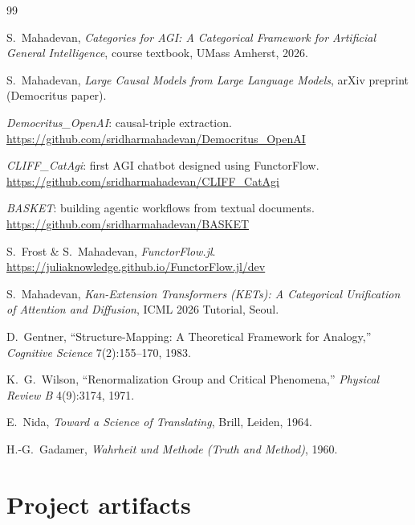 \documentclass[10pt,letterpaper]{article}
\begin{document}
\begin{thebibliography}{99}\small

 S.\ Mahadevan, \emph{Categories for AGI: A Categorical Framework for Artificial General Intelligence}, course textbook, UMass Amherst, 2026.

 S.\ Mahadevan, \emph{Large Causal Models from Large Language Models}, arXiv preprint (Democritus paper).

 \emph{Democritus\_OpenAI}: causal-triple extraction. \url{https://github.com/sridharmahadevan/Democritus_OpenAI}

 \emph{CLIFF\_CatAgi}: first AGI chatbot designed using FunctorFlow. \url{https://github.com/sridharmahadevan/CLIFF_CatAgi}

 \emph{BASKET}: building agentic workflows from textual documents. \url{https://github.com/sridharmahadevan/BASKET}

 S.\ Frost \& S.\ Mahadevan, \emph{FunctorFlow.jl}. \url{https://juliaknowledge.github.io/FunctorFlow.jl/dev}

 S.\ Mahadevan, \emph{Kan-Extension Transformers (KETs): A Categorical Unification of Attention and Diffusion}, ICML 2026 Tutorial, Seoul.

 D.\ Gentner, ``Structure-Mapping: A Theoretical Framework for Analogy,'' \emph{Cognitive Science} 7(2):155--170, 1983.

 K.\ G.\ Wilson, ``Renormalization Group and Critical Phenomena,'' \emph{Physical Review B} 4(9):3174, 1971.

 E.\ Nida, \emph{Toward a Science of Translating}, Brill, Leiden, 1964.

 H.-G.\ Gadamer, \emph{Wahrheit und Methode (Truth and Method)}, 1960.

\end{thebibliography}

\appendix

\section{Project artifacts}
\end{document}
